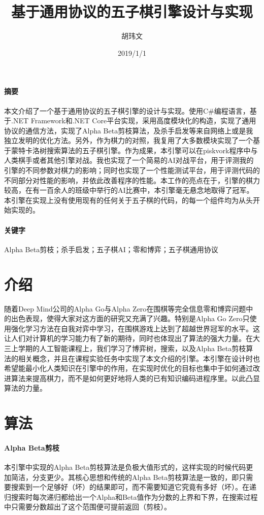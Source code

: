 \documentclass{ctexart}
\title{基于通用协议的五子棋引擎设计与实现}
\author{胡玮文}
\date{2019/1/1}
\begin{document}
\maketitle
\newpage

\paragraph{摘要} 本文介绍了一个基于通用协议的五子棋引擎的设计与实现。使用C\#编程语言，基于.NET Framework和.NET Core平台实现，采用高度模块化的构造，实现了通用协议\cite{WEBSITE:protocol}的通信方法，实现了Alpha Beta剪枝算法，及杀手启发等来自网络上或是我独立发明的优化方法。另外，作为棋力的对照，我复用了大多数模块实现了一个基于蒙特卡洛树搜索算法的五子棋引擎。作为成果，本引擎可以在piskvork\cite{WEBSITE:piskvorky}程序中与人类棋手或者其他引擎对战。我也实现了一个简易的AI对战平台，用于评测我的引擎的不同参数对棋力的影响；同时也实现了一个性能测试平台，用于评测代码的不同部分对性能的影响，并依此改善程序的性能。本工作的亮点在于，引擎的棋力较高，在有一百余人的班级中举行的AI比赛中，本引擎毫无悬念地取得了冠军。本引擎在实现上没有使用现有的任何关于五子棋的代码，的每一个组件均为从头开始实现的。

\paragraph{关键字} Alpha Beta剪枝；杀手启发；五子棋AI；零和博弈；五子棋通用协议

\section{介绍}
随着Deep Mind公司的Alpha Go与Alpha Zero\cite{ARTICLE:AlphaZero}在围棋等完全信息零和博弈问题中的出色表现，使得大家对这方面的研究又充满了兴趣。特别是Alpha Go Zero只使用强化学习方法在自我对弈中学习，在围棋游戏上达到了超越世界冠军的水平。这让人们对计算机的学习能力有了新的期待，同时也体现出了算法的强大力量。在大三上学期的人工智能课程上，我们学习了博弈树，搜索，以及Alpha Beta剪枝算法的相关概念，并且在课程实验任务中实现了本文介绍的引擎。本引擎在设计时也希望能最小化人类知识在引擎中的作用，在实现时优化的目标也集中于如何通过改进算法来提高棋力，而不是如何更好地将人类的已有知识编码进程序里。以此凸显算法的力量。

\section{算法}

\paragraph{Alpha Beta剪枝} 本引擎中实现的Alpha Beta剪枝算法是负极大值形式的，这样实现的时候代码更加简洁，分支更少。其核心思想和传统的Alpha Beta剪枝算法是一致的，即只需要搜索到一个足够好（坏）的结果即可，而不需要知道它究竟有多好（坏）。在递归搜索时每次递归都给出一个Alpha和Beta值作为分数的上界和下界，在搜索过程中只需要分数超出了这个范围便可提前返回（剪枝）。
\end{document}
